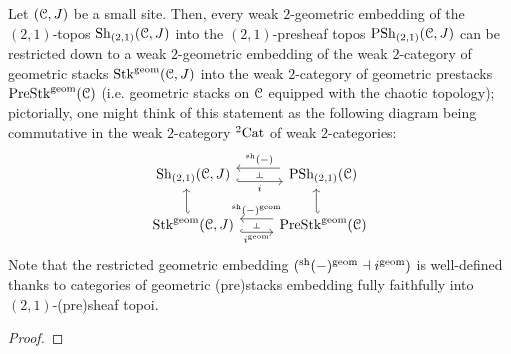                     \begin{theorem} \label{theorem: (2,1)_sheafification_of_geometric_prestacks}
                        Let $(\mathcal{C}, J)$ be a small site. Then, every weak $2$-geometric embedding of the $(2, 1)$-topos $\mathrm{Sh}_{(2, 1)}(\mathcal{C}, J)$ into the $(2, 1)$-presheaf topos $\mathrm{PSh}_{(2, 1)}(\mathcal{C}, J)$ can be restricted down to a weak $2$-geometric embedding of the weak $2$-category of geometric stacks $\mathrm{Stk}^{\mathrm{geom}}(\mathcal{C}, J)$ into the weak $2$-category of geometric prestacks $\mathrm{Pre}\mathrm{Stk}^{\mathrm{geom}}(\mathcal{C})$ (i.e. geometric stacks on $\mathcal{C}$ equipped with the chaotic topology); pictorially, one might think of this statement as the following diagram being commutative in the weak $2$-category ${}^2\mathrm{Cat}$ of weak $2$-categories: 
                            $$
                                \begin{tikzcd}
                                	{\Sh_{(2, 1)}(\C, J)} & {\Psh_{(2, 1)}(\C)} \\
                                	{\Stk^{\geom}(\C, J)} & {\Pre\Stk^{\geom}(\C)}
                                	\arrow[""{name=0, anchor=center, inner sep=0}, "{{}^{\sh}(-)}"', shift right=2, shorten <=2pt, from=1-2, to=1-1]
                                	\arrow[""{name=1, anchor=center, inner sep=0}, "i"', shift right=2, hook, from=1-1, to=1-2]
                                	\arrow[shift left=2, hook', from=2-1, to=1-1]
                                	\arrow[shift left=2, hook', from=2-2, to=1-2]
                                	\arrow[""{name=2, anchor=center, inner sep=0}, "{i^{\geom}}"', shift right=2, hook, from=2-1, to=2-2]
                                	\arrow[""{name=3, anchor=center, inner sep=0}, "{{}^{\sh}(-)^{\geom}}"', shift right=2, from=2-2, to=2-1]
                                	\arrow["\dashv"{anchor=center, rotate=-90}, draw=none, from=0, to=1]
                                	\arrow["\dashv"{anchor=center, rotate=-90}, draw=none, from=3, to=2]
                                \end{tikzcd}
                            $$
                        Note that the restricted geometric embedding $({}^{\mathrm{sh}}(-)^{\mathrm{geom}} \dashv i^{\mathrm{geom}})$ is well-defined thanks to categories of geometric (pre)stacks embedding fully faithfully into $(2, 1)$-(pre)sheaf topoi.
                    \end{theorem}
                        \begin{proof}
                            
                        \end{proof}
                
